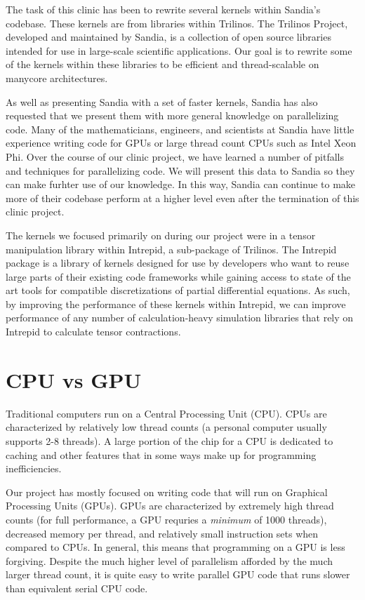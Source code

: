 The task of this clinic has been to rewrite several kernels within Sandia's codebase. These kernels are from libraries within
Trilinos. The Trilinos Project, developed and maintained by
Sandia, is a collection of open source libraries intended for use in large-scale
scientific applications. Our goal is to rewrite some of the kernels within these libraries to be 
efficient and thread-scalable on manycore architectures.

As well as presenting Sandia with a set of faster kernels, Sandia has also requested that we present them with more general 
knowledge on parallelizing code. Many of the mathematicians, engineers, and scientists at Sandia have little experience writing 
code for GPUs or large thread count CPUs such as Intel Xeon Phi.
Over the course of our clinic project, we have learned a number of pitfalls and techniques for 
parallelizing code. We will present this data to Sandia so they can make furhter use of our knowledge. In this way, 
Sandia can continue to make more of their codebase perform at a higher level even after the termination of this
clinic project.

The kernels we focused primarily on during our project were in a tensor manipulation library within Intrepid, 
a sub-package of Trilinos. 
The Intrepid package is a library of kernels designed for use by developers who want to reuse large
parts of their existing code frameworks while gaining access to state of the art
tools for compatible discretizations of partial differential equations. As such, by improving the 
performance of these kernels within Intrepid, we can improve performance
of any number of calculation-heavy simulation libraries that rely on Intrepid to calculate tensor contractions.


\section{CPU vs GPU} \label{CPU-GPU}

Traditional computers run on a Central Processing Unit (CPU). CPUs are characterized by relatively low thread
counts (a personal computer usually supports 2-8 threads). A large portion of the chip for a CPU is dedicated 
to caching and other features that in some ways make up for programming inefficiencies.

Our project has mostly focused on writing code that will run on Graphical Processing Units (GPUs).
GPUs are characterized by extremely high thread counts (for full performance, a GPU requries a \emph{minimum} of 1000 threads),
decreased memory per thread, and relatively small instruction sets when compared to CPUs. In general, this means 
that programming on a GPU is less forgiving. Despite the much higher level of parallelism afforded 
by the much larger thread count, it is quite easy to write parallel GPU code that runs slower than equivalent 
serial CPU code.

